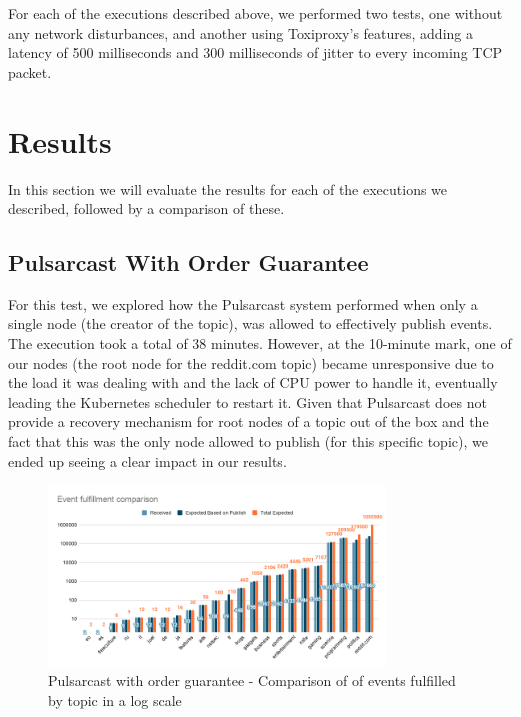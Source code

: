 For each of the executions described above, we performed two tests, one without
any network disturbances, and another using Toxiproxy's features, adding a
latency of 500 milliseconds and 300 milliseconds of jitter to every incoming
TCP packet. 

\section{Results}\label{results}

In this section we will evaluate the results for each of the executions we
described, followed by a comparison of these.

\subsection{Pulsarcast With Order Guarantee}\label{subsec:pulsarcast-with-order-guarantee}

For this test, we explored how the Pulsarcast system performed when only a
single node (the creator of the topic), was allowed to effectively publish
events. The execution took a total of 38 minutes. However, at the 10-minute
mark, one of our nodes (the root node for the reddit.com topic) became
unresponsive due to the load it was dealing with and the lack of CPU power to
handle it, eventually leading the Kubernetes scheduler to restart it.  Given
that Pulsarcast does not provide a recovery mechanism for root nodes of a topic
out of the box and the fact that this was the only node allowed to publish (for
this specific topic), we ended up seeing a clear impact in our results.

\begin{figure}[!htb]
  \centering
  \includegraphics[width=0.8\textwidth]{img/graph-pulsarcast-order-event-fulfillment-comparison.png}
  \caption{Pulsarcast with order guarantee - Comparison of of events fulfilled by topic in a log scale}
  \label{fig:graph-pulsarcast-order-event-fulfillment-comparison}
\end{figure}

